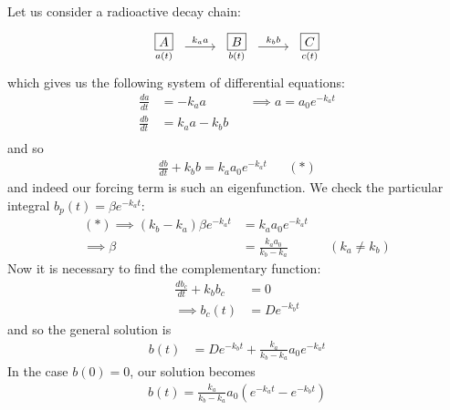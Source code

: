 \documentclass{../../template/note}
\begin{document}
    \begin{example}
        Let us consider a radioactive decay chain:
        \[\begin{tikzcd}[ampersand replacement=\&]
            \begin{array}{c} \substack{\boxed A \\ a(t)} \end{array} \& \begin{array}{c} \substack{\boxed B \\ b(t)} \end{array} \& \begin{array}{c} \substack{\boxed C \\ c(t)} \end{array}
            \arrow["{k_aa}", from=1-1, to=1-2]
            \arrow["{k_bb}", from=1-2, to=1-3]
        \end{tikzcd}\]
        which gives us the following system of differential equations:
        \begin{align*}
            \frac{da}{dt} &= -k_aa && \implies a=a_0e^{-k_at}\\
            \frac{db}{dt} &= k_aa - k_bb \\
        \end{align*}
        and so
        \begin{align*}
            \frac{db}{dt} + k_bb = k_aa_0e^{-k_at} && (*)
        \end{align*}
        and indeed our forcing term is such an eigenfunction. We check the particular integral \(b_p(t) = \beta e^{-k_a t}\):
        \begin{align*}
            (*) \implies (k_b-k_a)\beta e^{-k_at} &= k_aa_0e^{-k_at} \\
            \implies \beta &= \frac{k_aa_0}{k_b-k_a} && (k_a \neq k_b)
        \end{align*}
        Now it is necessary to find the complementary function:
        \begin{align*}
            \frac{db_c}{dt} + k_bb_c &= 0 \\
            \implies b_c(t) &= De^{-k_bt}
        \end{align*}
        and so the general solution is
        \begin{align*}
            b(t) &= De^{-k_bt} + \frac{k_a}{k_b-k_a}a_0 e^{-k_at}
        \end{align*}
        In the case \(b(0) = 0\), our solution becomes
        \begin{align*}
            b(t) = \frac{k_a}{k_b-k_a}a_0(e^{-k_at}-e^{-k_bt})
        \end{align*}
    \end{example}
    
\end{document}
